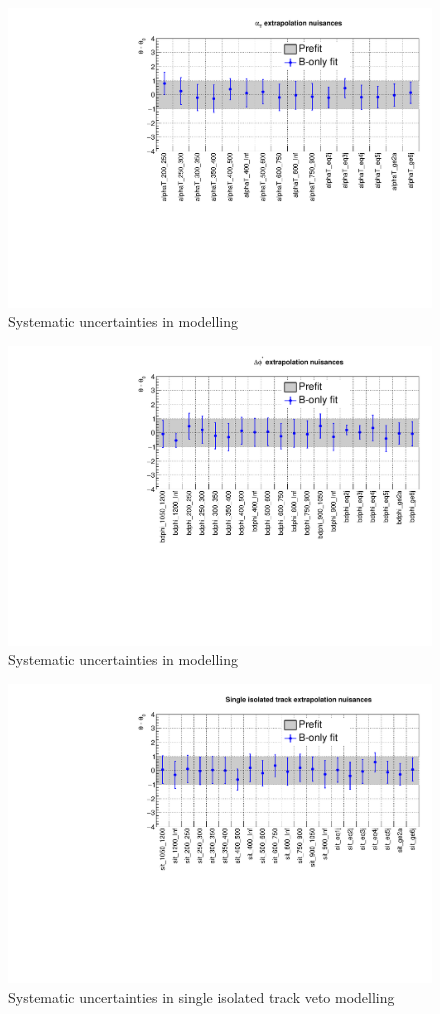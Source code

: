 \clearpage
\begin{figure}[h!]
  \centering
  \caption{Systematic uncertainties in \alphat modelling}
  \includegraphics[width=0.8\linewidth]{figures/results/36invfb_freeze/postfit/nuis/AlphaT_nuisances}
\end{figure}

\begin{figure}[h!]
  \centering
  \caption{Systematic uncertainties in \bdphi modelling}
  \includegraphics[width=0.8\linewidth]{figures/results/36invfb_freeze/postfit/nuis/bDPhi_nuisances}
\end{figure}

\clearpage
\begin{figure}[h!]
  \centering
  \caption{Systematic uncertainties in single isolated track veto modelling}
  \includegraphics[width=0.8\linewidth]{figures/results/36invfb_freeze/postfit/nuis/SIT_nuisances}
\end{figure}

